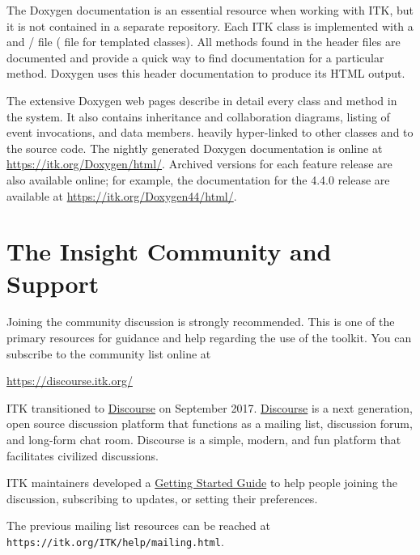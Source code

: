 The Doxygen documentation is an essential resource when working with ITK, but
it is not contained in a separate repository. Each ITK class is implemented
with a  and / file ( file for
templated classes). All methods found in the  header files are
documented and provide a quick way to find documentation for a particular
method.  Doxygen uses this header documentation to produce its HTML output.

The extensive Doxygen web pages describe in detail every class and method in
the system. It also contains inheritance and collaboration diagrams, listing
of event invocations, and data members.  heavily hyper-linked to other classes
and to the source code. The nightly generated Doxygen documentation is online at
\url{https://itk.org/Doxygen/html/}. Archived versions for each feature release
are also available online; for example, the documentation for the 4.4.0
release are available at \url{https://itk.org/Doxygen44/html/}.


\section{The Insight Community and Support}%
\label{sec:AdditionalResources}%
\label{sec:JoinDiscussion}%
%

Joining the community discussion is strongly recommended. This is one of the
primary resources for guidance and help regarding the use of the toolkit. You
can subscribe to the community list online at

\begin{center}
\url{https://discourse.itk.org/}
\end{center}

ITK transitioned to \href{https://www.discourse.org/}{Discourse} on September
2017. \href{https://www.discourse.org/}{Discourse} is a next generation, open
source discussion platform that functions as a mailing list, discussion forum,
and long-form chat room. Discourse is a simple, modern, and fun platform that
facilitates civilized discussions.

ITK maintainers developed a
\href{https://discourse.itk.org/t/getting-started-with-discourse/22}{Getting Started Guide}
to help people joining the discussion, subscribing to updates, or setting their
preferences.

The previous mailing list resources can be reached at
\texttt{https://itk.org/ITK/help/mailing.html}.

